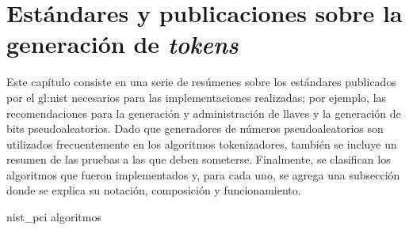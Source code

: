 %
%
%

\chapter{Estándares y publicaciones sobre la generación de \textit{tokens}}
\label{sec:generacion_de_tokens}

Este capítulo consiste en una serie de resúmenes sobre los estándares publicados
por el \gls{gl:nist} necesarios para las implementaciones realizadas; por
ejemplo, las recomendaciones para la generación y administración de llaves y la
generación de bits pseudoaleatorios. Dado que generadores de números
pseudoaleatorios son utilizados frecuentemente en los algoritmos tokenizadores,
también se incluye un resumen de las pruebas a las que deben someterse.
Finalmente, se clasifican los algoritmos que fueron implementados y, para cada
uno, se agrega una subsección donde se explica su notación, composición y
funcionamiento.

{nist_pci}
{algoritmos}
